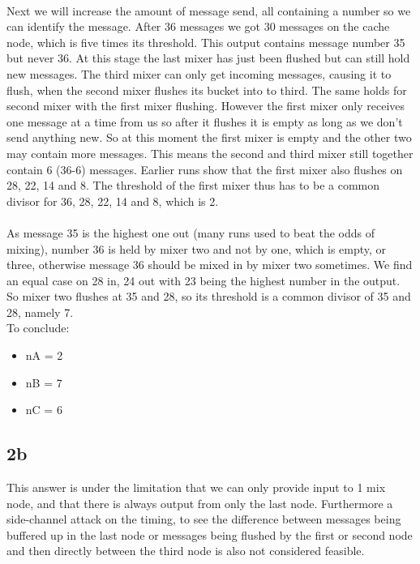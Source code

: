 \documentclass[a4paper,11pt]{article}
\begin{document}
\paragraph{} Next we will increase the amount of message send, all containing a number so we can identify the message.
After 36 messages we got 30 messages on the cache node, which is five times its threshold.
This output contains message number 35 but never 36.
At this stage the last mixer has just been flushed but can still hold new messages. The third mixer can only get incoming messages, causing it to flush, when the second mixer flushes its bucket into to third.
The same holds for second mixer with the first mixer flushing. However the first mixer only receives one message at a time from us so after it flushes it is empty as long as we don't send anything new. So at this moment the first mixer is empty and the other two may contain more messages.
This means the second and third mixer still together contain 6 (36-6) messages. 
Earlier runs show that the first mixer also flushes on 28, 22, 14 and 8. The threshold of the first mixer thus has to be a common divisor for 36, 28, 22, 14 and 8, which is 2.
\paragraph{}
As message 35 is the highest one out (many runs used to beat the odds of mixing), number 36 is held by mixer two and not by one, which is empty, or three, otherwise message 36 should be mixed in by mixer two sometimes.
We find an equal case on 28 in, 24 out with 23 being the highest number in the output. 
So mixer two flushes at 35 and 28, so its threshold is a common divisor of 35 and 28, namely 7.\\

To conclude:
\begin{itemize}
 \item nA = 2
 \item nB = 7
 \item nC = 6
\end{itemize}

\subsection{2b}
This answer is under the limitation that we can only provide input to 1 mix node, and that there is always output from only the last node. Furthermore a side-channel attack on the timing, to see the difference between messages being buffered up in the last node or messages being flushed by the first or second node and then directly between the third node is also not considered feasible.
\end{document}
